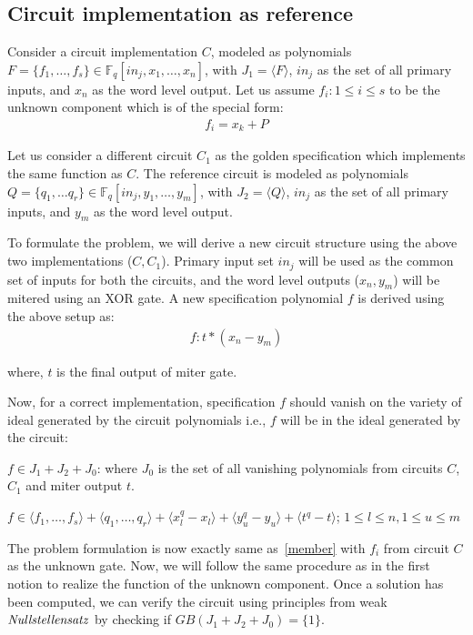 \subsection{Circuit implementation as reference}
Consider a circuit implementation $C$, modeled as polynomials $F = \{f_1,\dots,f_s\}\in \mathbb{F}_q[in_j,x_1,\dots, x_n]$, with $J_1=\langle F \rangle$, $in_j$ as the set of all primary inputs, and $x_n$ as the word level output. Let us assume $f_i:1\le i \le s$ to be the unknown component which is of the special form:
\begin{gather*} 
f_i = x_k + P
\end{gather*}

Let us consider a different circuit $C_1$ as the golden specification which implements the same function as $C$. The reference circuit is modeled as polynomials $Q = \{q_1,\dots q_r\}\in \mathbb{F}_q[in_j,y_1,\dots, y_m]$, with $J_2=\langle Q \rangle$, $in_j$ as the set of all primary inputs, and $y_m$ as the word level output.

To formulate the problem, we will derive a new circuit structure using the above two implementations ($C,C_1$). Primary input set $in_j$ will be used as the common set of inputs for both the circuits, and the word level outputs ($x_n,y_m$) will be mitered using an XOR gate. A new specification polynomial $f$ is derived using the above setup as:
\begin{gather}
f : t*(x_n-y_m)
\end{gather}

where, $t$ is the final output of miter gate.

Now, for a correct implementation, specification $f$ should vanish on the variety of ideal generated by the circuit polynomials i.e., $f$ will be in the ideal generated by the circuit:

$f \in J_1 + J_2 + J_0$: where $J_0$ is the set of all vanishing polynomials from circuits $C$, $C_1$ and miter output $t$.

{\small $f \in \langle f_1,\dots,f_s\rangle + \langle q_1,\dots,q_r\rangle + \langle x_l^q-x_l\rangle + \langle y_u^q-y_u\rangle + \langle t^q-t\rangle$; $1\le l \le n,1\le u \le m$}

The problem formulation is now exactly same as~\eqref{member} with $f_i$ from circuit $C$ as the unknown gate. Now, we will follow the same procedure as in the first notion to realize the function of the unknown component. Once a solution has been computed, we can verify the circuit using principles from weak $\it{Nullstellensatz}$ by checking if $GB(J_1+J_2+J_0)=\{1\}$.

